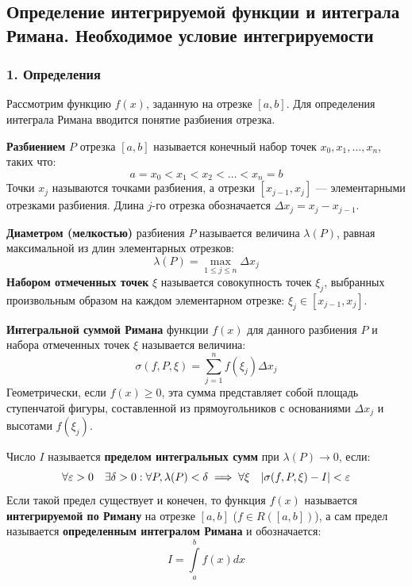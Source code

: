 \subsection{Определение интегрируемой функции и интеграла Римана. Необходимое условие интегрируемости}

\subsubsection*{1. Определения}

Рассмотрим функцию $f(x)$, заданную на отрезке $[a, b]$. Для определения интеграла Римана вводится понятие разбиения отрезка.

\begin{definition}[Разбиение]
\textbf{Разбиением} $P$ отрезка $[a, b]$ называется конечный набор точек $x_0, x_1, \dots, x_n$, таких что:
\[ a = x_0 < x_1 < x_2 < \dots < x_n = b \]
Точки $x_j$ называются точками разбиения, а отрезки $[x_{j-1}, x_j]$ — элементарными отрезками разбиения. Длина $j$-го отрезка обозначается $\Delta x_j = x_j - x_{j-1}$.
\end{definition}

\begin{definition}
\textbf{Диаметром (мелкостью)} разбиения $P$ называется величина $\lambda(P)$, равная максимальной из длин элементарных отрезков:
\[ \lambda(P) = \max_{1 \le j \le n} \Delta x_j \]
\textbf{Набором отмеченных точек} $\xi$ называется совокупность точек $\xi_j$, выбранных произвольным образом на каждом элементарном отрезке: $\xi_j \in [x_{j-1}, x_j]$.
\end{definition}

\begin{definition}
\textbf{Интегральной суммой Римана} функции $f(x)$ для данного разбиения $P$ и набора отмеченных точек $\xi$ называется величина:
\[ \sigma(f, P, \xi) = \sum_{j=1}^n f(\xi_j) \Delta x_j \]
Геометрически, если $f(x) \ge 0$, эта сумма представляет собой площадь ступенчатой фигуры, составленной из прямоугольников с основаниями $\Delta x_j$ и высотами $f(\xi_j)$.
\end{definition}

\begin{definition}
Число $I$ называется \textbf{пределом интегральных сумм} при $\lambda(P) \to 0$, если:
\[ \forall \varepsilon > 0 \quad \exists \delta > 0 : \forall P, \lambda(P) < \delta \implies \forall \xi \quad |\sigma(f, P, \xi) - I| < \varepsilon \]
Если такой предел существует и конечен, то функция $f(x)$ называется \textbf{интегрируемой по Риману} на отрезке $[a, b]$ ($f \in R([a, b])$), а сам предел называется \textbf{определенным интегралом Римана} и обозначается:
\[ I = \int\limits_a^b f(x) dx \]
\end{definition}

